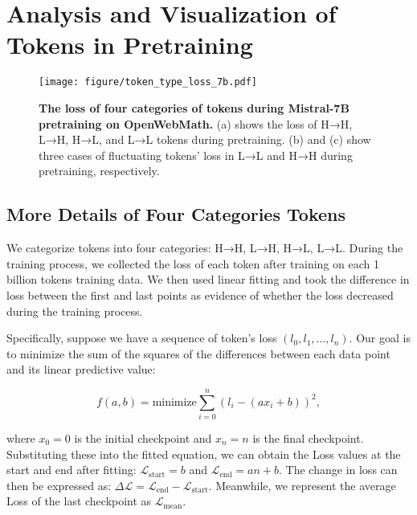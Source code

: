 \section{Analysis and Visualization of Tokens in Pretraining}

\begin{figure*}[t]
\centering
\texttt{[image: figure/token\_type\_loss\_7b.pdf]}
\caption{\textbf{The loss of four categories of tokens during Mistral-7B pretraining on OpenWebMath.} (a) shows the loss of H→H, L→H, H→L, and L→L tokens during pretraining. (b) and (c) show three cases of fluctuating tokens' loss in L→L and H→H during pretraining, respectively.}
\label{fig:tokenppl_7b}
\end{figure*}

\subsection{More Details of Four Categories Tokens}
\label{sec:appendix:categorie_detail}


We categorize tokens into four categories: H→H, L→H, H→L, L→L. During the training process, we collected the loss of each token after training on each 1 billion tokens training data. We then used linear fitting and took the difference in loss between the first and last points as evidence of whether the loss decreased during the training process.

Specifically, suppose we have a sequence of token's loss $(l_0, l_1, ..., l_n)$. Our goal is to minimize the sum of the squares of the differences between each data point and its linear predictive value:

\begin{equation}
f(a, b) = \text{minimize} \sum_{i=0}^n (l_i - (ax_i + b))^2,
\label{equ:lossfitting}
\end{equation}

where $x_0=0$ is the initial checkpoint and $x_n=n$ is the final checkpoint. Substituting these into the fitted equation, we can obtain the Loss values at the start and end after fitting: $ \mathcal{L}_{\text{start}} = b$ and $\mathcal{L}_{\text{end}} = an + b$. The change in loss can then be expressed as: $\Delta \mathcal{L} = \mathcal{L}_{\text{end}} - \mathcal{L}_{\text{start}}$. Meanwhile, we represent the average Loss of the last checkpoint as $\mathcal{L}_{\text{mean}}$.

